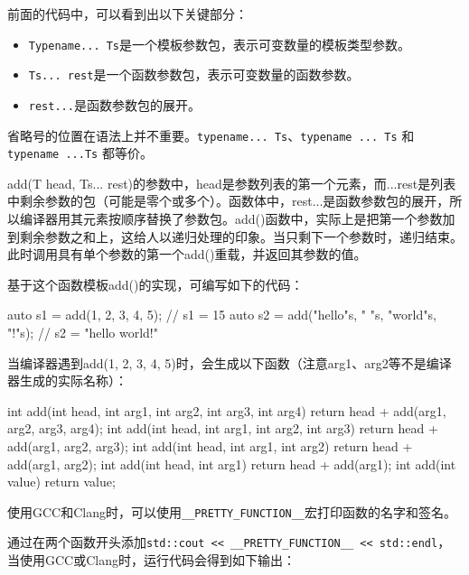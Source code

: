 前面的代码中，可以看到出以下关键部分：

\begin{itemize}
\item
\verb|Typename... Ts|是一个模板参数包，表示可变数量的模板类型参数。

\item
\verb|Ts... rest|是一个函数参数包，表示可变数量的函数参数。

\item
\verb|rest...|是函数参数包的展开。
\end{itemize}

\begin{myNotic}
省略号的位置在语法上并不重要。\verb|typename... Ts|、\verb|typename ... Ts| 和 \verb|typename ...Ts| 都等价。
\end{myNotic}

add(T head, Ts... rest)的参数中，head是参数列表的第一个元素，而...rest是列表中剩余参数的包（可能是零个或多个）。函数体中，rest...是函数参数包的展开，所以编译器用其元素按顺序替换了参数包。add()函数中，实际上是把第一个参数加到剩余参数之和上，这给人以递归处理的印象。当只剩下一个参数时，递归结束。此时调用具有单个参数的第一个add()重载，并返回其参数的值。

基于这个函数模板add()的实现，可编写如下的代码：

\begin{cpp}
auto s1 = add(1, 2, 3, 4, 5); // s1 = 15
auto s2 = add("hello"s, " "s, "world"s, "!"s); // s2 = "hello world!"
\end{cpp}

当编译器遇到add(1, 2, 3, 4, 5)时，会生成以下函数（注意arg1、arg2等不是编译器生成的实际名称）：

\begin{cpp}
int add(int head, int arg1, int arg2, int arg3, int arg4)
{return head + add(arg1, arg2, arg3, arg4);}
int add(int head, int arg1, int arg2, int arg3)
{return head + add(arg1, arg2, arg3);}
int add(int head, int arg1, int arg2)
{return head + add(arg1, arg2);}
int add(int head, int arg1)
{return head + add(arg1);}
int add(int value)
{return value;}
\end{cpp}

\begin{myTip}
使用GCC和Clang时，可以使用\verb|__PRETTY_FUNCTION__|宏打印函数的名字和签名。
\end{myTip}

通过在两个函数开头添加\verb|std::cout << __PRETTY_FUNCTION__ << std::endl|，当使用GCC或Clang时，运行代码会得到如下输出：

